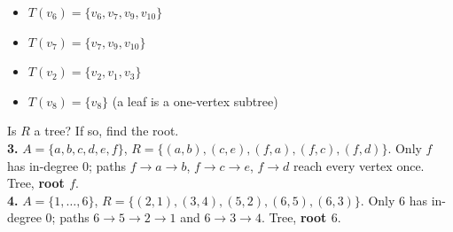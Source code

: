 \documentclass{fkt-notes}
\theoremstyle{definition}
\begin{document}
\begin{example}\leavevmode\par\noindent
  \begin{minipage}[c]{0.36\textwidth}
    \centering
  \end{minipage}\hfill
  \begin{minipage}[c]{0.6\textwidth}
    \begin{itemize}[nosep]
      \item $T(v_6)=\{v_6,v_7,v_9,v_{10}\}$
      \item $T(v_7)=\{v_7,v_9,v_{10}\}$
      \item $T(v_2)=\{v_2,v_1,v_3\}$
      \item $T(v_8)=\{v_8\}$ (a leaf is a one-vertex subtree)
    \end{itemize}
  \end{minipage}
\end{example}

\begin{example}[7.1 Ex.~3--4]
  Is $R$ a tree? If so, find the root.\\
  \textbf{3.} $A=\{a,b,c,d,e,f\}$, $R=\{(a,b),(c,e),(f,a),(f,c),(f,d)\}$.
  Only $f$ has in-degree $0$; paths $f\to a\to b$, $f\to c\to e$, $f\to d$
  reach every vertex once. Tree, \textbf{root $f$}.\\
  \textbf{4.} $A=\{1,\dots,6\}$, $R=\{(2,1),(3,4),(5,2),(6,5),(6,3)\}$.
  Only $6$ has in-degree $0$; paths $6\to5\to2\to1$ and $6\to3\to4$.
  Tree, \textbf{root $6$}.
\end{example}
\end{document}
